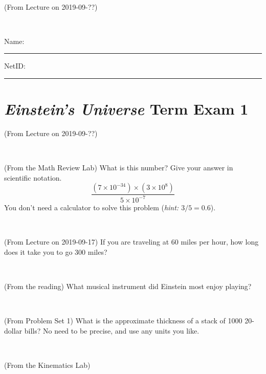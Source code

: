 \documentclass[12pt, letterpaper]{article}
\begin{document}
\vfill ~

\begin{problem} (From Lecture on 2019-09-??)
\end{problem}


\vfill ~


\cleardoublepage



\noindent
Name: \rule[-1ex]{0.60\textwidth}{0.1pt}
NetID: \rule[-1ex]{0.20\textwidth}{0.1pt}

\section*{\textsl{Einstein's Universe} Term Exam 1}
\setcounter{problem}{1}


\begin{problem} (From Lecture on 2019-09-??)
\end{problem}


\vfill ~

\begin{problem} (From the Math Review Lab)
What is this number? Give your answer in scientific notation.
$$
\frac{(7\times10^{-34})\times(3\times10^8)}{5\times10^{-7}}
$$
You don't need a calculator to solve this problem (\textit{hint: $3/5=0.6$}).
\end{problem}


\vfill ~

\begin{problem} (From Lecture on 2019-09-17)
If you are traveling at 60 miles per hour, how long does
it take you to go 300 miles?
\end{problem}


\vfill ~

\begin{problem} (From the reading)
What musical instrument did Einstein most enjoy playing?
\end{problem}


\vfill ~


\clearpage


\begin{problem} (From Problem Set 1)
What is the approximate thickness of a stack of 1000 20-dollar bills?
No need to be precise, and use any units you like.
\end{problem}


\vfill ~

\begin{problem} (From the Kinematics Lab)

\end{problem}
\end{document}
